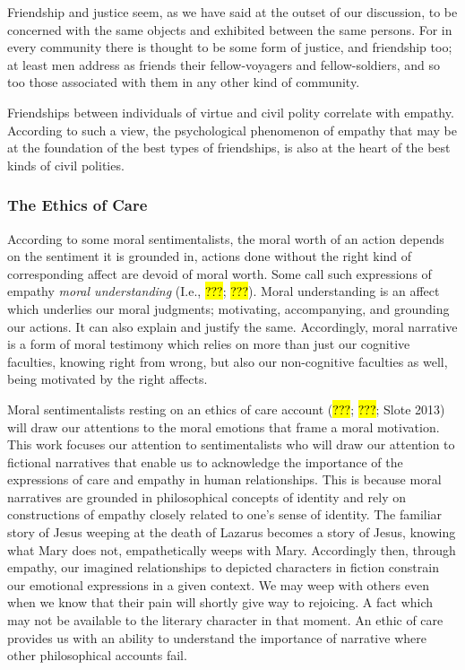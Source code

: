 \documentclass[
  letterpaper,
  DIV=11,
  numbers=noendperiod]{scrartcl}
\theoremstyle{remark}
\begin{document}
Friendship and justice seem, as we have said at the outset of our
discussion, to be concerned with the same objects and exhibited between
the same persons. For in every community there is thought to be some
form of justice, and friendship too; at least men address as friends
their fellow-voyagers and fellow-soldiers, and so too those associated
with them in any other kind of community.

Friendships between individuals of virtue and civil polity correlate
with empathy. According to such a view, the psychological phenomenon of
empathy that may be at the foundation of the best types of friendships,
is also at the heart of the best kinds of civil polities.

\subsubsection{The Ethics of Care}\label{the-ethics-of-care}

According to some moral sentimentalists, the moral worth of an action
depends on the sentiment it is grounded in, actions done without the
right kind of corresponding affect are devoid of moral worth. Some call
such expressions of empathy \emph{moral understanding} (I.e., \hl{???};
\hl{???}). Moral understanding is an affect which underlies our moral
judgments; motivating, accompanying, and grounding our actions. It can
also explain and justify the same. Accordingly, moral narrative is a
form of moral testimony which relies on more than just our cognitive
faculties, knowing right from wrong, but also our non-cognitive
faculties as well, being motivated by the right affects.

Moral sentimentalists resting on an ethics of care account (\hl{???};
\hl{???}; Slote 2013) will draw our attentions to the moral emotions
that frame a moral motivation. This work focuses our attention to
sentimentalists who will draw our attention to fictional narratives that
enable us to acknowledge the importance of the expressions of care and
empathy in human relationships. This is because moral narratives are
grounded in philosophical concepts of identity and rely on constructions
of empathy closely related to one's sense of identity. The familiar
story of Jesus weeping at the death of Lazarus becomes a story of Jesus,
knowing what Mary does not, empathetically weeps with Mary. Accordingly
then, through empathy, our imagined relationships to depicted characters
in fiction constrain our emotional expressions in a given context. We
may weep with others even when we know that their pain will shortly give
way to rejoicing. A fact which may not be available to the literary
character in that moment. An ethic of care provides us with an ability
to understand the importance of narrative where other philosophical
accounts fail.
\end{document}
